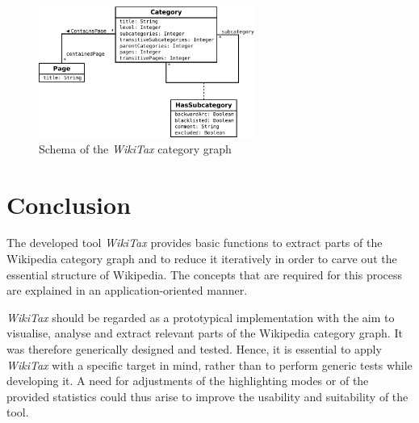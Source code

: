 \documentclass{scrartcl}
\begin{document}
\begin{figure}[ht]
\centering
\includegraphics[width=0.63\textwidth]{figures/full_schema.pdf} 
\caption{Schema of the \emph{WikiTax} category graph}
\label{fig:full_schema}
\end{figure}

\section{Conclusion}
\label{sec:conclusion}
The developed tool \emph{WikiTax} provides basic functions to extract parts of the Wikipedia category graph and to reduce it iteratively in order to carve out the essential structure of Wikipedia. The concepts that are required for this process are explained in an application-oriented manner.

\emph{WikiTax} should be regarded as a prototypical implementation with the aim to visualise, analyse and extract relevant parts of the Wikipedia category graph. It was therefore generically designed and tested. Hence, it is essential to apply \emph{WikiTax} with a specific target in mind, rather than to perform generic tests while developing it. A need for adjustments of the highlighting modes or of the provided statistics could thus arise to improve the usability and suitability of the tool.



\end{document}
